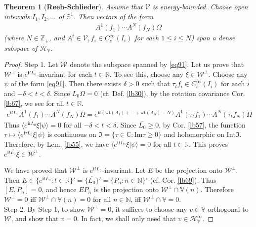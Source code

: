 \documentclass[12pt,b5paper,notitlepage]{article}
\theoremstyle{definition}
\theoremstyle{plain}
\newtheorem{thm}[df]{Theorem}
\newcommand{\fk}{\mathfrak}
\newcommand{\mc}{\mathcal}
\newcommand{\ovl}{\overline}
\newcommand{\bk}[1]{\langle {#1}\rangle}
\newcommand{\im}{\mathbf{i}}
\newcommand{\Vbb}{\mathbb V}
\newcommand{\Cbb}{\mathbb C}
\newcommand{\Nbb}{\mathbb N}
\newcommand{\Zbb}{\mathbb Z}
\newcommand{\Rbb}{\mathbb R}
\newcommand{\wt}{\mathrm{wt}}
\newcommand{\Sbb}{{\mathbb S}}
\newcommand{\Imag}{\mathrm{Im}}
\newcommand{\Int}{\mathrm{Int}}
\newcommand{\HV}{\mathcal H_{\mathbb V}}
\numberwithin{equation}{section}
\begin{document}
\subsection{}


\begin{thm}[\textbf{Reeh-Schlieder}]\label{lb70}
Assume that $\mc V$ is energy-bounded. Choose open intervals $I_1,I_2,\dots$ of $\Sbb^1$. Then vectors of the form
\begin{align}\label{eq91}
A^1(f_1)\cdots A^N(f_N)\Omega
\end{align}
(where $N\in\Zbb_+$, and $A^i\in\mc V,f_i\in C_c^\infty(I_i)$ for each $1\leq i\leq N$) span a dense subspace of $\HV$.
\end{thm}

\begin{proof}
Step 1. Let $\mc W$ denote the subspace spanned by \eqref{eq91}. Let us prove that $\mc W^\perp$ is $e^{\im t\ovl{L_0}}$-invariant for each $t\in\Rbb$. To see this, choose any $\xi\in\mc W^\perp$. Choose any $\psi$ of the form \eqref{eq91}. Then there exists $\delta>0$ such that $\tau_tf_i\in C_c^\infty(I_i)$ for each $i$ and $-\delta<t<\delta$. Since $L_0\Omega=0$ (cf. Def. \ref{lb30}), by the rotation covariance Cor. \ref{lb67}, we see for all $t\in\Rbb$.
\begin{align*}
e^{\im t\ovl{L_0}}A^1(f_1)\cdots A^N(f_N)\Omega=e^{\im t(\wt(A_1)+\cdots+\wt(A_N)-N)}A^1(\tau_tf_1)\cdots A^N(\tau_tf_N)\Omega
\end{align*}
Thus $\bk{e^{\im t\ovl{L_0}}\xi|\psi}=0$ for all $-\delta<t<\delta$. Since $\ovl{L_0}\geq0$, by Cor. \ref{lb57}, the function $\tau\mapsto\bk{e^{\im\tau\ovl{L_0}}\xi|\psi}$ is continuous on $\fk I=\{\tau\in\Cbb:\Imag\tau\geq0\}$ and holomorphic on $\Int\fk I$. Therefore, by Lem. \ref{lb55}, we have $\bk{e^{\im t\ovl{L_0}}\xi|\psi}=0$ for all $t\in\Rbb$. This proves $e^{\im t\ovl{L_0}}\xi\in\mc W^\perp$. 


We have proved that $\mc W^\perp$ is $e^{\im t\ovl{L_0}}$-invariant. Let $E$ be the projection onto $\mc W^\perp$. Then $E\in\{e^{\im t\ovl{L_0}}:t\in\Rbb\}'=\{\ovl{L_0}\}'=\{P_n:n\in\Nbb\}'$ (cf. Cor. \ref{lb69}). Thus $[E,P_n]=0$, and hence $EP_n$ is the projection onto $\mc W^\perp\cap\Vbb(n)$. Therefore $\mc W^\perp=0$ iff $\mc W^\perp\cap\Vbb(n)=0$ for all $n\in\Nbb$, iff $\mc W^\perp\cap\Vbb=0$.\\[-1ex]

Step 2. By Step 1, to show $\mc W^\perp=0$, it suffices to choose any $v\in\Vbb$ orthogonal to $\mc W$, and show that $v=0$. In fact, we shall only need that $v\in\HV^\infty$.


\end{proof}
\end{document}
